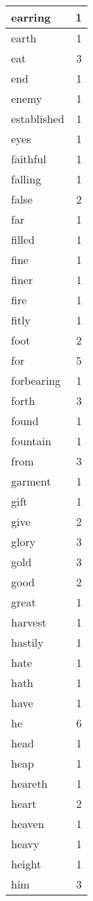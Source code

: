 \begin{center}
\begin{longtable}{l|r}
earring & 1\\ \hline 
earth & 1\\ \hline 
eat & 3\\ \hline 
end & 1\\ \hline 
enemy & 1\\ \hline 
established & 1\\ \hline 
eyes & 1\\ \hline 
faithful & 1\\ \hline 
falling & 1\\ \hline 
false & 2\\ \hline 
far & 1\\ \hline 
filled & 1\\ \hline 
fine & 1\\ \hline 
finer & 1\\ \hline 
fire & 1\\ \hline 
fitly & 1\\ \hline 
foot & 2\\ \hline 
for & 5\\ \hline 
forbearing & 1\\ \hline 
forth & 3\\ \hline 
found & 1\\ \hline 
fountain & 1\\ \hline 
from & 3\\ \hline 
garment & 1\\ \hline 
gift & 1\\ \hline 
give & 2\\ \hline 
glory & 3\\ \hline 
gold & 3\\ \hline 
good & 2\\ \hline 
great & 1\\ \hline 
harvest & 1\\ \hline 
hastily & 1\\ \hline 
hate & 1\\ \hline 
hath & 1\\ \hline 
have & 1\\ \hline 
he & 6\\ \hline 
head & 1\\ \hline 
heap & 1\\ \hline 
heareth & 1\\ \hline 
heart & 2\\ \hline 
heaven & 1\\ \hline 
heavy & 1\\ \hline 
height & 1\\ \hline 
him & 3\\ \hline 

\end{longtable}
\end{center}
